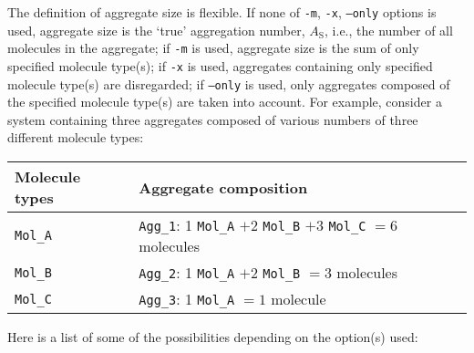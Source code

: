 The definition of aggregate size is flexible. If none of \texttt{-m},
\texttt{-x}, \texttt{--only} options is used, aggregate size is the `true'
aggregation number, $A_{\mathrm{S}}$, i.e., the number of all molecules in
the aggregate; if \texttt{-m} is used, aggregate size is the sum of only
specified molecule type(s); if \texttt{-x} is used, aggregates containing
only specified molecule type(s) are disregarded; if \texttt{--only} is
used, only aggregates composed of the specified molecule type(s) are taken
into account. For example, consider a system containing three aggregates
composed of various numbers of three different molecule types:
\noindent
\begin{longtable}{l|l}
  \toprule
  Molecule types & Aggregate composition \\
  \midrule
  \texttt{Mol\_A} & \texttt{Agg\_1}: 1 \texttt{Mol\_A} $+2$ \texttt{Mol\_B} $+3$ \texttt{Mol\_C} $=6$ molecules \\
  \texttt{Mol\_B} & \texttt{Agg\_2}: 1 \texttt{Mol\_A} $+2$ \texttt{Mol\_B} $=3$ molecules \\
  \texttt{Mol\_C} & \texttt{Agg\_3}: 1 \texttt{Mol\_A} $=1$ molecule \\
  \bottomrule
\end{longtable}
\noindent
Here is a list of some of the possibilities depending on the option(s)
used:
